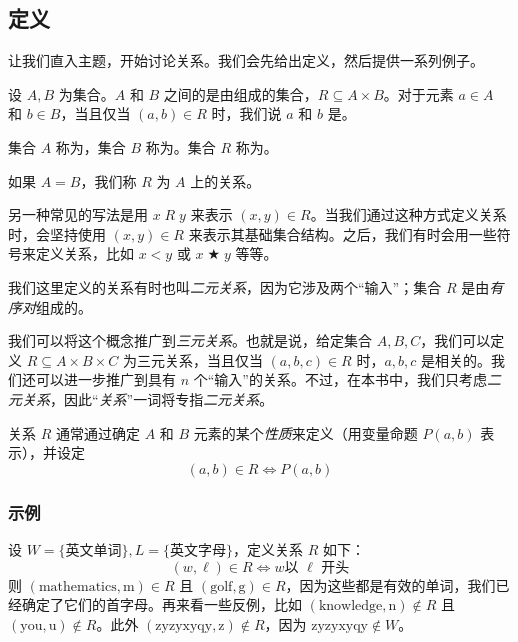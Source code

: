 
\subsection{定义}

让我们直入主题，开始讨论关系。我们会先给出定义，然后提供一系列例子。

\begin{definition}
    设 $A, B$ 为集合。$A$ 和 $B$ 之间的是由组成的集合，$R \subseteq A \times B$。对于元素 $a \in A$ 和 $b \in B$，当且仅当 $(a, b) \in R$ 时，我们说 $a$ 和 $b$ 是。

    集合 $A$ 称为，集合 $B$ 称为。集合 $R$ 称为。
    
    如果 $A = B$，我们称 $R$ 为 $A$ 上的关系。
\end{definition}

另一种常见的写法是用 $x \;R\; y$ 来表示 $(x,y) \in R$。当我们通过这种方式定义关系时，会坚持使用 $(x, y) \in R$ 来表示其基础集合结构。之后，我们有时会用一些符号来定义关系，比如 $x < y$ 或 $x \;\bigstar\; y$ 等等。

\begin{remark}
    我们这里定义的关系有时也叫\emph{二元关系}，因为它涉及两个``输入''；集合 $R$ 是由\emph{有序对}组成的。

    我们可以将这个概念推广到\emph{三元关系}。也就是说，给定集合 $A,B,C$，我们可以定义 $R \subseteq A \times B \times C$ 为三元关系，当且仅当 $(a, b, c) \in R$ 时，$a,b,c$ 是相关的。我们还可以进一步推广到具有 $n$ 个``输入''的关系。不过，在本书中，我们只考虑\emph{二元关系}，因此``\emph{关系}''一词将专指\emph{二元关系}。
\end{remark}

\begin{remark}
    关系 $R$ 通常通过确定 $A$ 和 $B$ 元素的某个\emph{性质}来定义（用变量命题 $P(a,b)$ 表示），并设定
    \[(a,b) \in R \iff P(a,b)\]
\end{remark}

\subsubsection*{示例}

\begin{example}
    设 $W=\{\text{英文单词}\}, L=\{\text{英文字母}\}$，定义关系 $R$ 如下：
    \[(w, \ell) \in R \iff w \text{以 } \ell \text{ 开头}\]
    则 $(\text{mathematics},\text{m}) \in R$ 且 $(\text{golf},\text{g}) \in R$，因为这些都是有效的单词，我们已经确定了它们的首字母。再来看一些反例，比如 $(\text{knowledge},\text{n}) \notin R$ 且 $(\text{you},\text{u}) \notin R$。此外 $(\text{zyzyxyqy},\text{z}) \notin R$，因为 $\text{zyzyxyqy} \notin W$。
\end{example}

